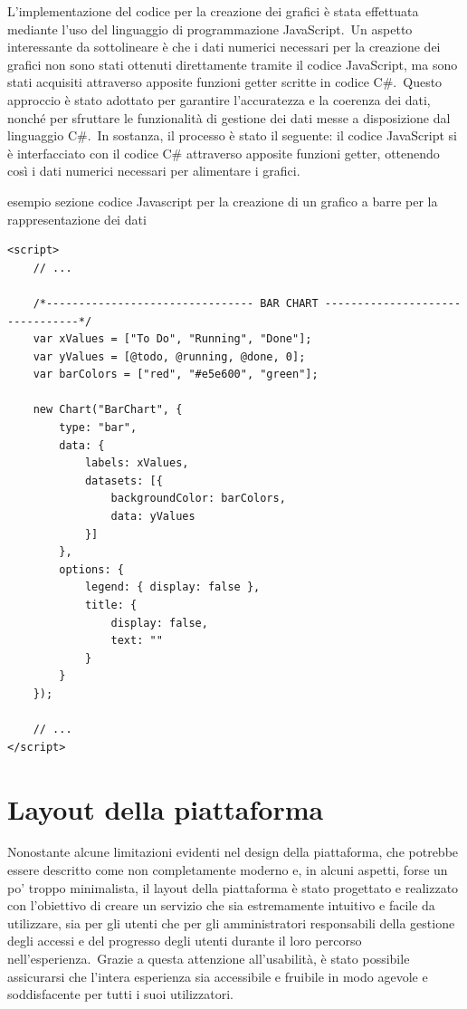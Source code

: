 L'implementazione del codice per la creazione dei grafici è stata effettuata mediante l'uso del linguaggio di programmazione JavaScript.\ 
Un aspetto interessante da sottolineare è che i dati numerici necessari per la creazione dei grafici non sono stati ottenuti direttamente 
tramite il codice JavaScript, ma sono stati acquisiti attraverso apposite funzioni getter scritte in codice C\#.\ 
Questo approccio è stato adottato per garantire l'accuratezza e la coerenza dei dati, nonché per sfruttare le funzionalità di gestione 
dei dati messe a disposizione dal linguaggio C\#.\
In sostanza, il processo è stato il seguente: il codice JavaScript si è interfacciato con il codice C\# attraverso apposite funzioni getter, 
ottenendo così i dati numerici necessari per alimentare i grafici.\
\begin{algorithm}[H]
 	\caption{esempio sezione codice Javascript per la creazione di un grafico a barre per la rappresentazione dei dati}
 	\label{lst:genic_mpi}
 	\begin{lstlisting}[label=JavaScript]
<script>
	// ...
	
	/*-------------------------------- BAR CHART --------------------------------*/
    var xValues = ["To Do", "Running", "Done"];
    var yValues = [@todo, @running, @done, 0];
    var barColors = ["red", "#e5e600", "green"];

    new Chart("BarChart", {
        type: "bar",
        data: {
            labels: xValues,
            datasets: [{
                backgroundColor: barColors,
                data: yValues
            }]
        },
        options: {
            legend: { display: false },
            title: {
                display: false,
                text: ""
            }
        }
    });

	// ...
</script>
 	\end{lstlisting}
\end{algorithm}
%
\section{Layout della piattaforma}\label{sec:cap_sec_subsec}
Nonostante alcune limitazioni evidenti nel design della piattaforma, che potrebbe essere descritto come non completamente moderno e, 
in alcuni aspetti, forse un po' troppo minimalista, il layout della piattaforma è stato progettato e realizzato con l'obiettivo di 
creare un servizio che sia estremamente intuitivo e facile da utilizzare, sia per gli utenti 
che per gli amministratori responsabili della gestione degli accessi e del progresso degli utenti 
durante il loro percorso nell'esperienza.\ Grazie a questa attenzione all'usabilità, 
è stato possibile assicurarsi che l'intera esperienza sia accessibile e fruibile in modo agevole 
e soddisfacente per tutti i suoi utilizzatori.